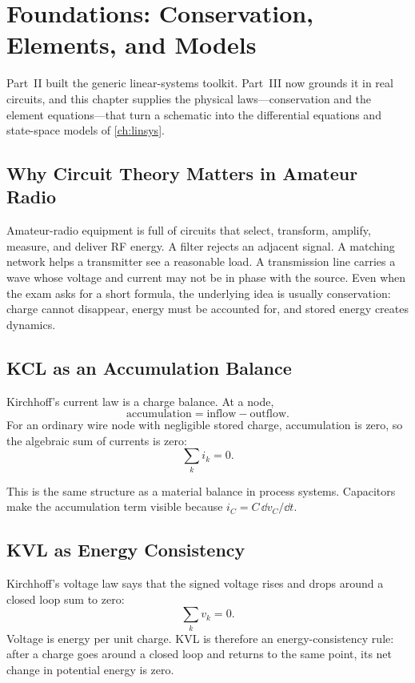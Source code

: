 \chapter{Foundations: Conservation, Elements, and Models}
\label{ch:foundations}
Part~II built the generic linear-systems toolkit. Part~III now grounds it in real
circuits, and this chapter supplies the physical laws---conservation and the
element equations---that turn a schematic into the differential equations and
state-space models of \cref{ch:linsys}.

\section{Why Circuit Theory Matters in Amateur Radio}
Amateur-radio equipment is full of circuits that select, transform, amplify,
measure, and deliver RF energy. A filter rejects an adjacent signal. A matching
network helps a transmitter see a reasonable load. A transmission line carries a
wave whose voltage and current may not be in phase with the source. Even when
the exam asks for a short formula, the underlying idea is usually conservation:
charge cannot disappear, energy must be accounted for, and stored energy creates
dynamics.

\section{KCL as an Accumulation Balance}
Kirchhoff's current law is a charge balance. At a node,
\[
\text{accumulation}=\text{inflow}-\text{outflow}.
\]
For an ordinary wire node with negligible stored charge, accumulation is zero,
so the algebraic sum of currents is zero:
\[
\sum_k i_k=0.
\]

\begin{controlsbox}
This is the same structure as a material balance in process systems. Capacitors
make the accumulation term visible because \(i_C=C\,\dd v_C/\dd t\).
\end{controlsbox}

\section{KVL as Energy Consistency}
Kirchhoff's voltage law says that the signed voltage rises and drops around a
closed loop sum to zero:
\[
\sum_k v_k=0.
\]
Voltage is energy per unit charge. KVL is therefore an energy-consistency rule:
after a charge goes around a closed loop and returns to the same point, its net
change in potential energy is zero.


